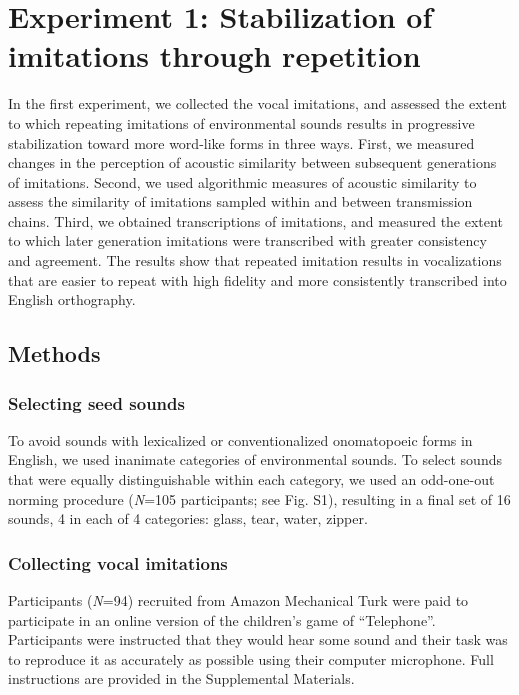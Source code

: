 \documentclass[english,floatsintext,man]{apa6}
\theoremstyle{definition}
\theoremstyle{definition}
\theoremstyle{definition}
\theoremstyle{remark}
\begin{document}
\hypertarget{experiment-1-stabilization-of-imitations-through-repetition}{%
\section{Experiment 1: Stabilization of imitations through
repetition}\label{experiment-1-stabilization-of-imitations-through-repetition}}

In the first experiment, we collected the vocal imitations, and assessed
the extent to which repeating imitations of environmental sounds results
in progressive stabilization toward more word-like forms in three ways.
First, we measured changes in the perception of acoustic similarity
between subsequent generations of imitations. Second, we used
algorithmic measures of acoustic similarity to assess the similarity of
imitations sampled within and between transmission chains. Third, we
obtained transcriptions of imitations, and measured the extent to which
later generation imitations were transcribed with greater consistency
and agreement. The results show that repeated imitation results in
vocalizations that are easier to repeat with high fidelity and more
consistently transcribed into English orthography.

\hypertarget{methods}{%
\subsection{Methods}\label{methods}}

\hypertarget{selecting-seed-sounds}{%
\subsubsection{Selecting seed sounds}\label{selecting-seed-sounds}}

To avoid sounds with lexicalized or conventionalized onomatopoeic forms
in English, we used inanimate categories of environmental sounds. To
select sounds that were equally distinguishable within each category, we
used an odd-one-out norming procedure (\emph{N}=105 participants; see
Fig. S1), resulting in a final set of 16 sounds, 4 in each of 4
categories: glass, tear, water, zipper.

\hypertarget{collecting-vocal-imitations}{%
\subsubsection{Collecting vocal
imitations}\label{collecting-vocal-imitations}}

Participants (\emph{N}=94) recruited from Amazon Mechanical Turk were
paid to participate in an online version of the children's game of
\enquote{Telephone}. Participants were instructed that they would hear
some sound and their task was to reproduce it as accurately as possible
using their computer microphone. Full instructions are provided in the
Supplemental Materials.
\end{document}
